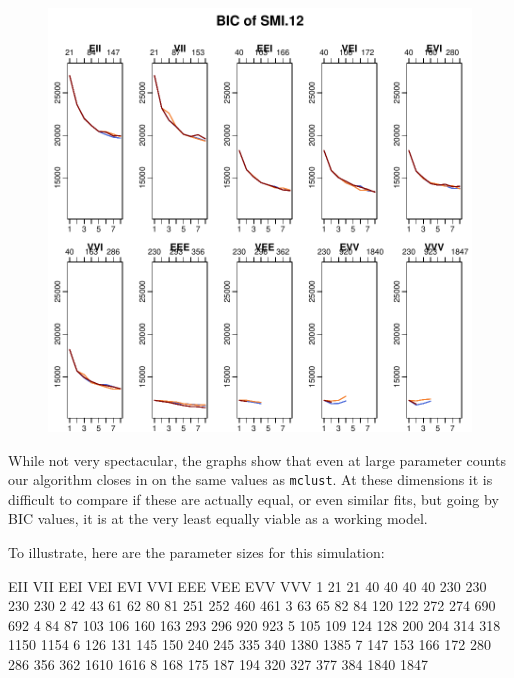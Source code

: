 \begin{figure}[h]
    \centering
\includegraphics{chapter3-2smiplot}
\end{figure}

While not very spectacular, the graphs show that even at large parameter
counts our algorithm closes in on the same values as {\tt mclust}.
At these dimensions it is difficult to compare if these are actually 
equal, or even similar fits, but going by BIC values, it is at the very 
least equally viable as a working model.

To illustrate, here are the parameter sizes for this simulation:
\begin{Schunk}
\begin{Soutput}
  EII VII EEI VEI EVI VVI EEE VEE  EVV  VVV
1  21  21  40  40  40  40 230 230  230  230
2  42  43  61  62  80  81 251 252  460  461
3  63  65  82  84 120 122 272 274  690  692
4  84  87 103 106 160 163 293 296  920  923
5 105 109 124 128 200 204 314 318 1150 1154
6 126 131 145 150 240 245 335 340 1380 1385
7 147 153 166 172 280 286 356 362 1610 1616
8 168 175 187 194 320 327 377 384 1840 1847
\end{Soutput}
\end{Schunk}



